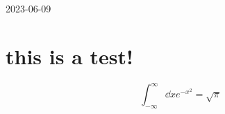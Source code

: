 


2023-06-09

\section{this is a test!}


\[ \int_{-\infty}^{\infty}\dd x e^{-x^2} =\sqrt{\pi}  \]


